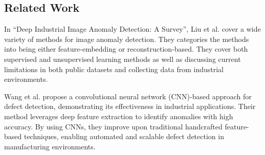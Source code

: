 \subsection{Related Work}

In ``Deep Industrial Image Anomaly Detection: A Survey'', Liu et al. cover a wide variety of methods for image anomaly detection. They categories the methods into being either feature-embedding or reconstruction-based. They cover both supervised and unsupervised learning methods as well as discussing current limitations in both public datasets and collecting data from industrial environments. 
\par
Wang et al. \cite{wang2018defect} propose a convolutional neural network (CNN)-based approach for defect detection, demonstrating its effectiveness in industrial applications. 
Their method leverages deep feature extraction to identify anomalies with high accuracy. 
By using CNNs, they improve upon traditional handcrafted feature-based techniques, enabling automated and scalable defect detection in manufacturing environments.